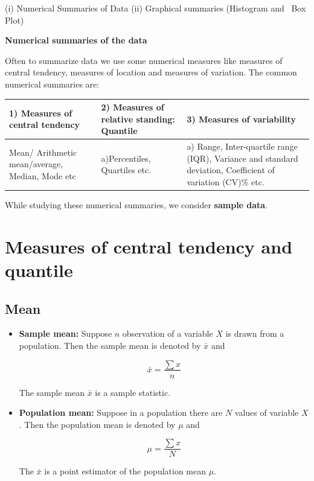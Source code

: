 \documentclass[
  11pt,
  letterpaper,
  DIV=11,
  numbers=noendperiod]{scrreprt}
\begin{document}
(i) Numerical Summaries of Data (ii) Graphical summaries (Histogram and
~Box Plot)

\textbf{Numerical summaries of the data}

Often to summarize data we use some numerical measures like measures of
central tendency, measures of location and measures of variation. The
common numerical summaries are:

\begin{longtable}[]{@{}
  >{\raggedright\arraybackslash}p{}
  >{\raggedright\arraybackslash}p{}
  >{\raggedright\arraybackslash}p{}@{}}
\toprule\noalign{}
\begin{minipage}[b]{\linewidth}\raggedright
1) Measures of central tendency
\end{minipage} & \begin{minipage}[b]{\linewidth}\raggedright
2) Measures of relative standing: Quantile
\end{minipage} & \begin{minipage}[b]{\linewidth}\raggedright
3) Measures of variability
\end{minipage} \\
\midrule\noalign{}
\endhead
\bottomrule\noalign{}
\endlastfoot
Mean/ Arithmetic mean/average, Median, Mode etc & a)Percentiles,
Quartiles etc. & a) Range, Inter-quartile range (IQR), Variance and
standard deviation, Coefficient of variation (CV)\% etc. \\
\end{longtable}

While studying these numerical summaries, we consider \textbf{sample
data}.

\section{Measures of central tendency and
quantile}\label{measures-of-central-tendency-and-quantile}

\subsection{Mean}\label{mean}

\begin{itemize}
\item
  \textbf{Sample mean:} Suppose \(n\) observation of a variable \(X\) is
  drawn from a population. Then the sample mean is denoted by \(\bar x\)
  and

  \[\bar x =\frac{\sum x}{n}\]

  The sample mean \(\bar x\) is a sample statistic.
\item
  \textbf{Population mean:} Suppose in a population there are \(N\)
  values of variable \(X\). Then the population mean is denoted by
  \(\mu\) and

  \[\mu =\frac{\sum x}{N}\]

  The \(\bar x\) is a point estimator of the population mean \(\mu\).
\end{itemize}
\end{document}
